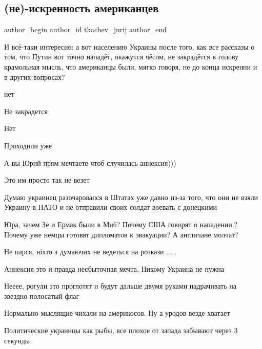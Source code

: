  
 
 
 
 
\subsection{(не)-искренность американцев}
\label{sec:22_01_2022.tg.tkachev_jurij.1.amerikancy}
 
\ifcmt
 author_begin
   author_id tkachev_jurij
 author_end
\fi

\raggedcolumns
\begin{multicols}{2} %
\setlength{\parindent}{0pt}

И всё-таки интересно: а вот населению Украины после того, как все рассказы о
том, что Путин вот точно нападёт, окажутся чёсом, не закрадётся в голову
крамольная мысль, что американцы были, мягко говоря, не до конца искренни и в
других вопросах?

нет

Не закрадется

Нет

Проходили уже

А вы Юрий прям мечтаете чтоб случилась аннексия)))

Это им просто так не везет


Думаю украинец разочаровался в Штатах уже давно из-за того, что они не взяли
Украину в НАТО и не отправили своих солдат воевать с донецкими


Юра, зачем Зе и Ермак были в Ми6? Почему США говорят о нападении.? Почему уже
немцы готовят дипломатов к эвакуации? А англичане молчат?


Не парся, ніхто з думаючих не ведеться на розкази ... .


Аннексия это и правда несбыточная мечта. Никому Украина не нужна


Нееее, рогули это проглотят и будут дальше двумя руками надрачивать на звездно-полосатый флаг


Нормально мыслящие чихали на  америкосов. Ну а уродов везде хватает


Политические украинцы как рыбы, все плохое от запада забывают через 3 секунды

\end{multicols} %
